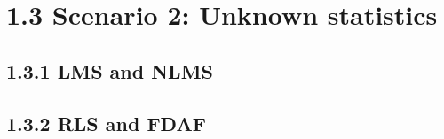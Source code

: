 \documentclass[12pt]{article}
\renewcommand{\_}{\kern-1.5pt\textunderscore\kern-1.5pt}
\begin{document}
\section*{1.3   Scenario 2: Unknown statistics}
\subsection*{1.3.1  LMS and NLMS}
\subsubsection{}
\subsubsection{}
\subsection*{1.3.2  RLS and FDAF}
\setcounter{subsubsection}{2}
\subsubsection{}
\subsubsection{}
\subsubsection{}
\subsubsection{}

\printbibliography
\end{document}
